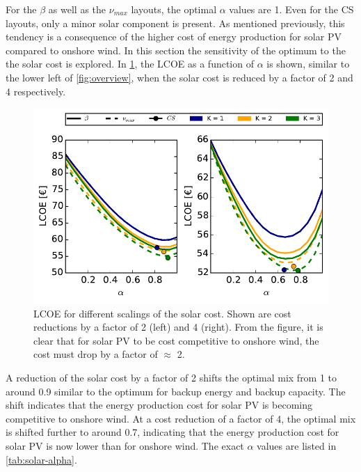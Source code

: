 \documentclass[a4paper, 12pt, sort&compress]{elsarticle}%
\begin{document}
For the $\beta$ as well as the $\nu_{max}$ layouts, the optimal
$\alpha$ values are 1. Even for the CS layouts, only a minor solar
component is present. As mentioned previously, this tendency is a
consequence of the higher cost of energy production for solar PV
compared to onshore wind. In this section the sensitivity of the
optimum to the the solar cost is explored. In \cref{fig:red-solar}, the
LCOE as a function of $\alpha$ is shown, similar to the lower left of
\cref{fig:overview}, when the solar cost is reduced by a factor of 2
and 4 respectively.

\begin{figure}[h!]
  \centering
  \includegraphics[width = \columnwidth]{solarAnalysis}
  \caption{LCOE for different scalings of the solar cost. Shown are
    cost reductions by a factor of 2 (left) and 4 (right). From the
    figure, it is clear that for solar PV to be cost competitive to
    onshore wind, the cost must drop by a factor of
    $\approx$ 2.}
  \label{fig:red-solar}
\end{figure}

A reduction of the solar cost by a factor of 2 shifts the optimal mix
from 1 to around 0.9 similar to the optimum for backup energy and
backup capacity. The shift indicates that the energy production cost
for solar PV is becoming competitive to onshore wind. At a cost
reduction of a factor of 4, the optimal mix is shifted further to
around 0.7, indicating that the energy production cost for solar PV is
now lower than for onshore wind. The exact $\alpha$ values are listed in
\cref{tab:solar-alpha}.
\end{document}
